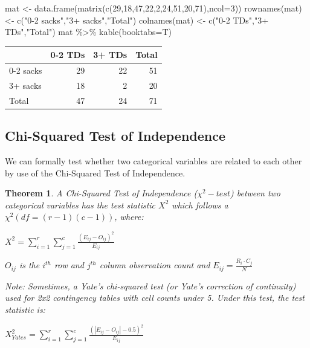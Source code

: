 \documentclass[
  11pt,
]{book}
\newenvironment{Shaded}{\begin{snugshade}}{\end{snugshade}}
\newcommand{\AttributeTok}[1]{\textcolor[rgb]{0.77,0.63,0.00}{#1}}
\newcommand{\DecValTok}[1]{\textcolor[rgb]{0.00,0.00,0.81}{#1}}
\newcommand{\FunctionTok}[1]{\textcolor[rgb]{0.00,0.00,0.00}{#1}}
\newcommand{\NormalTok}[1]{#1}
\newcommand{\OtherTok}[1]{\textcolor[rgb]{0.56,0.35,0.01}{#1}}
\newcommand{\SpecialCharTok}[1]{\textcolor[rgb]{0.00,0.00,0.00}{#1}}
\newcommand{\StringTok}[1]{\textcolor[rgb]{0.31,0.60,0.02}{#1}}
\newtheorem{theorem}{Theorem}[chapter]
\theoremstyle{definition}
\theoremstyle{definition}
\theoremstyle{definition}
\theoremstyle{definition}
\theoremstyle{remark}
\begin{document}
\begin{Shaded}
\begin{Highlighting}[]
\NormalTok{mat }\OtherTok{\textless{}{-}} \FunctionTok{data.frame}\NormalTok{(}\FunctionTok{matrix}\NormalTok{(}\FunctionTok{c}\NormalTok{(}\DecValTok{29}\NormalTok{,}\DecValTok{18}\NormalTok{,}\DecValTok{47}\NormalTok{,}\DecValTok{22}\NormalTok{,}\DecValTok{2}\NormalTok{,}\DecValTok{24}\NormalTok{,}\DecValTok{51}\NormalTok{,}\DecValTok{20}\NormalTok{,}\DecValTok{71}\NormalTok{),}\AttributeTok{ncol=}\DecValTok{3}\NormalTok{))}
\FunctionTok{rownames}\NormalTok{(mat) }\OtherTok{\textless{}{-}} \FunctionTok{c}\NormalTok{(}\StringTok{"0{-}2 sacks"}\NormalTok{,}\StringTok{"3+ sacks"}\NormalTok{,}\StringTok{"Total"}\NormalTok{)}
\FunctionTok{colnames}\NormalTok{(mat) }\OtherTok{\textless{}{-}} \FunctionTok{c}\NormalTok{(}\StringTok{"0{-}2 TDs"}\NormalTok{,}\StringTok{"3+ TDs"}\NormalTok{,}\StringTok{"Total"}\NormalTok{)}
\NormalTok{mat }\SpecialCharTok{\%\textgreater{}\%} \FunctionTok{kable}\NormalTok{(}\AttributeTok{booktabs=}\NormalTok{T)}
\end{Highlighting}
\end{Shaded}

\begin{tabular}{lrrr}
\toprule
  & 0-2 TDs & 3+ TDs & Total\\
\midrule
0-2 sacks & 29 & 22 & 51\\
3+ sacks & 18 & 2 & 20\\
Total & 47 & 24 & 71\\
\bottomrule
\end{tabular}

\vfill

\newpage

\hypertarget{chi-squared-test-of-independence}{%
\subsection{Chi-Squared Test of Independence}\label{chi-squared-test-of-independence}}

We can formally test whether two categorical variables are related to each other by use of the Chi-Squared Test of Independence.

\begin{theorem}
A Chi-Squared Test of Independence (\(\chi^2-test\)) between two categorical variables has the test statistic \(X^2\) which follows a \(\chi^2(df=(r-1)(c-1))\), where:

\(X^2 = \sum_{i=1}^r\sum_{j=1}^c\frac{(E_{ij}-O_{ij})^2}{E_{ij}}\)

\(O_{ij}\) is the \(i^{th}\) row and \(j^{th}\) column observation count and \(E_{ij} = \frac{R_i \cdot C_j}{N}\)

Note: Sometimes, a Yate's chi-squared test (or Yate's correction of continuity) used for 2x2 contingency tables with cell counts under 5. Under this test, the test statistic is:

\(X^2_{Yates} = \sum_{i=1}^r\sum_{j=1}^c\frac{(|E_{ij}-O_{ij}|-0.5)^2}{E_{ij}}\)
\end{theorem}
\end{document}
